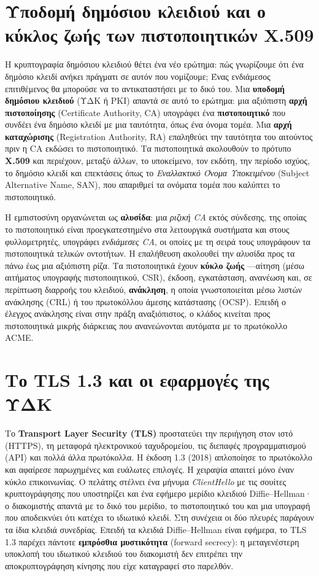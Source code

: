 \documentclass[11pt,openany]{book}
\begin{document}
\section{Υποδομή δημόσιου κλειδιού και ο κύκλος ζωής των πιστοποιητικών X.509}\label{sec:7.4}
Η κρυπτογραφία δημόσιου κλειδιού θέτει ένα νέο ερώτημα: πώς γνωρίζουμε ότι ένα δημόσιο κλειδί ανήκει πράγματι σε αυτόν που νομίζουμε; Ένας ενδιάμεσος επιτιθέμενος θα μπορούσε να το αντικαταστήσει με το δικό του. Μια \textbf{υποδομή δημόσιου κλειδιού} (ΥΔΚ ή PKI) απαντά σε αυτό το ερώτημα: μια αξιόπιστη \textbf{αρχή πιστοποίησης} (Certificate Authority, CA) υπογράφει ένα \textbf{πιστοποιητικό} που συνδέει ένα δημόσιο κλειδί με μια ταυτότητα, όπως ένα όνομα τομέα. Μια \textbf{αρχή καταχώρισης} (Registration Authority, RA) επαληθεύει την ταυτότητα του αιτούντος πριν η CA εκδώσει το πιστοποιητικό. Τα πιστοποιητικά ακολουθούν το πρότυπο \textbf{X.509} και περιέχουν, μεταξύ άλλων, το υποκείμενο, τον εκδότη, την περίοδο ισχύος, το δημόσιο κλειδί και επεκτάσεις όπως το \emph{Εναλλακτικό Όνομα Υποκειμένου} (Subject Alternative Name, SAN), που απαριθμεί τα ονόματα τομέα που καλύπτει το πιστοποιητικό.

Η εμπιστοσύνη οργανώνεται ως \textbf{αλυσίδα}: μια \emph{ριζική CA} εκτός σύνδεσης, της οποίας το πιστοποιητικό είναι προεγκατεστημένο στα λειτουργικά συστήματα και στους φυλλομετρητές, υπογράφει \emph{ενδιάμεσες CA}, οι οποίες με τη σειρά τους υπογράφουν τα πιστοποιητικά τελικών οντοτήτων. Η επαλήθευση ακολουθεί την αλυσίδα προς τα πάνω έως μια αξιόπιστη ρίζα. Τα πιστοποιητικά έχουν \textbf{κύκλο ζωής} —αίτηση (μέσω αιτήματος υπογραφής πιστοποιητικού, CSR), έκδοση, εγκατάσταση, ανανέωση και, σε περίπτωση διαρροής του κλειδιού, \textbf{ανάκληση}, η οποία γνωστοποιείται μέσω λιστών ανάκλησης (CRL) ή του πρωτοκόλλου άμεσης κατάστασης (OCSP). Επειδή ο έλεγχος ανάκλησης είναι στην πράξη αναξιόπιστος, ο κλάδος κινείται προς πιστοποιητικά μικρής διάρκειας που ανανεώνονται αυτόματα με το πρωτόκολλο ACME.

\section{Το TLS 1.3 και οι εφαρμογές της ΥΔΚ}\label{sec:7.5}
Το \textbf{Transport Layer Security (TLS)} προστατεύει την περιήγηση στον ιστό (HTTPS), τη μεταφορά ηλεκτρονικού ταχυδρομείου, τις διεπαφές προγραμματισμού (API) και πολλά άλλα πρωτόκολλα. Η έκδοση 1.3 (2018) απλοποίησε το πρωτόκολλο και αφαίρεσε παρωχημένες και ευάλωτες επιλογές. Η χειραψία απαιτεί μόνο έναν κύκλο επικοινωνίας. Ο πελάτης στέλνει ένα μήνυμα \emph{ClientHello} με τις σουίτες κρυπτογράφησης που υποστηρίζει και ένα εφήμερο μερίδιο κλειδιού Diffie–Hellman· ο διακομιστής απαντά με το δικό του μερίδιο, το πιστοποιητικό του και μια υπογραφή που αποδεικνύει ότι κατέχει το ιδιωτικό κλειδί. Στη συνέχεια οι δύο πλευρές παράγουν τα ίδια κλειδιά συνεδρίας. Επειδή τα κλειδιά Diffie–Hellman είναι εφήμερα, το TLS 1.3 παρέχει πάντοτε \textbf{εμπρόσθια μυστικότητα} (forward secrecy): η μεταγενέστερη υποκλοπή του ιδιωτικού κλειδιού του διακομιστή δεν επιτρέπει την αποκρυπτογράφηση κίνησης που είχε καταγραφεί στο παρελθόν.
\end{document}
